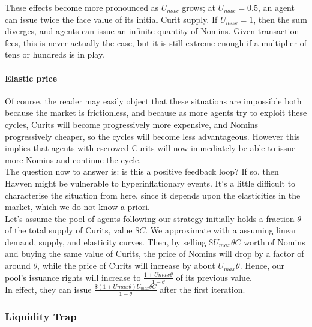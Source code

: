 \noindent These effects become more pronounced as \(U_{max}\) grows; at \(U_{max} = 0.5\), an agent can issue twice the face value of its initial Curit supply. If \(U_{max} = 1\), then the sum diverges, and agents can issue an infinite quantity of Nomins. Given transaction fees, this is never actually the case, but it is still extreme enough if a multiplier of tens or hundreds is in play. \\

\paragraph{Elastic price}

Of course, the reader may easily object that these situations are impossible both because the market is frictionless, and because as more agents try to exploit these cycles, Curits will become progressively more expensive, and Nomins progressively cheaper, so the cycles will become less advantageous.
However this implies that agents with escrowed Curits will now immediately be
able to issue more Nomins and continue the cycle. \\

\noindent The question now to answer is: is this a positive feedback loop? If so, then Havven might be vulnerable to hyperinflationary events. It's a little difficult to characterise the situation from here, since it depends upon the
elasticities in the market, which we do not know a priori. \\

Let's assume the pool of agents following our strategy initially holds a fraction \(\theta\) of the total supply of Curits, value \(\$C\). We approximate with a assuming linear demand, supply, and elasticity curves. 
Then, by selling \(\$ U_{max} \theta C\) worth of Nomins and buying the same value of Curits, the price of Nomins will drop by a factor of around \(\theta\), while the price of Curits will increase by about \(U_{max} \theta\).
Hence, our pool's issuance rights will increase to \(\frac{1 + U{max} \theta}{1 - \theta}\) of its previous value.\\

In effect, they can issue \(\frac{\$ (1 + U{max} \theta) U_{max} \theta C}{1 - \theta}\) after the first iteration.

\subsubsection{Liquidity Trap}

